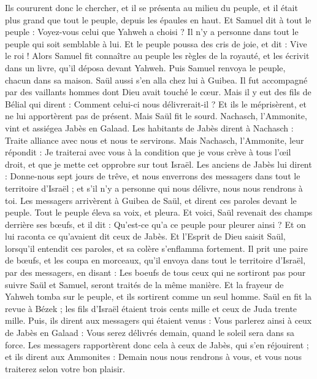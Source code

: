 \begin{multicols}{2}
Ils coururent donc le chercher, et il se présenta au milieu du peuple, et il était plus grand que tout le peuple, depuis les épaules en haut.
Et Samuel dit à tout le peuple : Voyez-vous celui que Yahweh a choisi ? Il n'y a personne dans tout le peuple qui soit semblable à lui. Et le peuple poussa des cris de joie, et dit : Vive le roi !
Alors Samuel fit connaître au peuple les règles de la royauté, et les écrivit dans un livre, qu'il déposa devant Yahweh. Puis Samuel renvoya le peuple, chacun dans sa maison.
Saül aussi s'en alla chez lui à Guibea. Il fut accompagné par des vaillants hommes dont Dieu avait touché le cœur.
Mais il y eut des fils de Bélial qui dirent : Comment celui-ci nous délivrerait-il ? Et ils le méprisèrent, et ne lui apportèrent pas de présent. Mais Saül fit le sourd.
\VerseOne{}Nachasch, l'Ammonite, vint et assiégea Jabès en Galaad. Les habitants de Jabès dirent à Nachasch : Traite alliance avec nous et nous te servirons.
Mais Nachasch, l'Ammonite, leur répondit : Je traiterai avec vous à la condition que je vous crève à tous l'œil droit, et que je mette cet opprobre sur tout Israël.
Les anciens de Jabès lui dirent : Donne-nous sept jours de trêve, et nous enverrons des messagers dans tout le territoire d'Israël ; et s'il n'y a personne qui nous délivre, nous nous rendrons à toi.
Les messagers arrivèrent à Guibea de Saül, et dirent ces paroles devant le peuple. Tout le peuple éleva sa voix, et pleura.
Et voici, Saül revenait des champs derrière ses bœufs, et il dit : Qu'est-ce qu'a ce peuple pour pleurer ainsi ? Et on lui raconta ce qu'avaient dit ceux de Jabès.
Et l'Esprit de Dieu saisit Saül, lorsqu'il entendit ces paroles, et sa colère s'enflamma fortement.
Il prit une paire de bœufs, et les coupa en morceaux, qu'il envoya dans tout le territoire d'Israël, par des messagers, en disant : Les boeufs de tous ceux qui ne sortiront pas pour suivre Saül et Samuel, seront traités de la même manière. Et la frayeur de Yahweh tomba sur le peuple, et ils sortirent comme un seul homme.
Saül en fit la revue à Bézek ; les fils d'Israël étaient trois cents mille et ceux de Juda trente mille.
Puis, ils dirent aux messagers qui étaient venus : Vous parlerez ainsi à ceux de Jabès en Galaad : Vous serez délivrés demain, quand le soleil sera dans sa force. Les messagers rapportèrent donc cela à ceux de Jabès, qui s'en réjouirent ;
et ils dirent aux Ammonites : Demain nous nous rendrons à vous, et vous nous traiterez selon votre bon plaisir.

\end{multicols}
